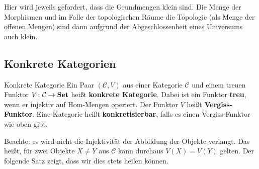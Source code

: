 \documentclass[a4paper]{amsart}
\theoremstyle{definition}
\newcommand{\CC}{\ensuremath{\mathcal{ C }}}
\newcommand{\Set}{\text{\textbf{Set}} }
\begin{document}
Hier wird jeweils gefordert, dass die Grundmengen klein sind. Die Menge der Morphismen und im Falle der topologischen Räume die Topologie (als Menge der offenen Mengen) sind dann aufgrund der Abgeschlossenheit eines Universums auch klein.

\subsection{Konkrete Kategorien}
\begin{Definition}{Konkrete Kategorie}
   Ein Paar $(\CC, V)$ aus einer Kategorie $\CC$ und einem treuen Funktor $V \colon \CC \to \Set$ heißt \textbf{konkrete Kategorie}. Dabei ist ein Funktor \textbf{treu}, wenn er injektiv auf Hom-Mengen operiert. Der Funktor $V$ heißt \textbf{Vergiss-Funktor}. Eine Kategorie heißt \textbf{konkretisierbar}, falls es einen Vergiss-Funktor wie oben gibt.
\end{Definition}

Beachte: es wird nicht die Injektivität der Abbildung der Objekte verlangt. Das heißt, für zwei Objekte $X \ne Y$ aus $\CC$ kann durchaus $V(X) = V(Y)$ gelten. Der folgende Satz zeigt, dass wir dies stets heilen können.
\end{document}
